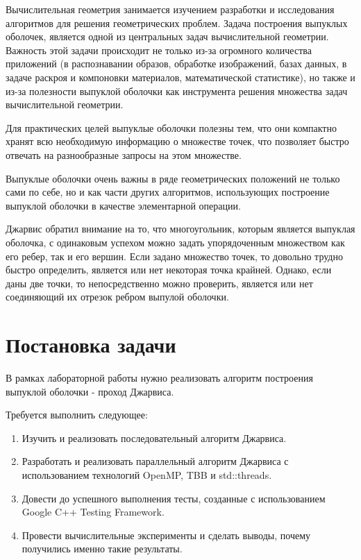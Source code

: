 \documentclass{report}
\begin{document}
Вычислительная геометрия занимается изучением разработки и исследования алгоритмов для решения геометрических проблем. Задача построения выпуклых оболочек, является одной из центральных задач вычислительной геометрии. Важность этой задачи происходит не только из-за огромного количества приложений (в распознавании образов, обработке изображений, базах данных, в задаче раскроя и компоновки материалов, математической статистике), но также и из-за полезности выпуклой оболочки как инструмента решения множества задач вычислительной геометрии.

\par Для практических целей выпуклые оболочки полезны тем, что они компактно хранят всю необходимую информацию о множестве точек, что позволяет быстро отвечать на разнообразные запросы на этом множестве.

\par Выпуклые оболочки очень важны в ряде геометрических положений не только сами по себе, но и как части других алгоритмов, использующих построение выпуклой оболочки в качестве элементарной операции.

\par Джарвис обратил внимание на то, что многоугольник, которым является выпуклая оболочка, с одинаковым успехом можно задать упорядоченным множеством как его ребер, так и его вершин. Если задано множество точек, то довольно трудно быстро определить, является или нет некоторая точка крайней. Однако, если даны две точки, то непосредственно можно проверить, является или нет соединяющий их отрезок ребром выпулой оболочки.

\newpage

\section{Постановка задачи}

В рамках лабораторной работы нужно реализовать алгоритм построения выпуклой оболочки - проход Джарвиса.

\par Требуется выполнить следующее:

\begin{enumerate}
\item Изучить и реализовать последовательный алгоритм Джарвиса.
\item Разработать и реализовать параллельный алгоритм Джарвиса с использованием технологий OpenMP, TBB и std::threads.
\item Довести до успешного выполнения тесты, созданные с использованием Google C++ Testing Framework.
\item Провести вычислительные эксперименты и сделать выводы, почему получились именно такие результаты.
\end{enumerate}
\end{document}
